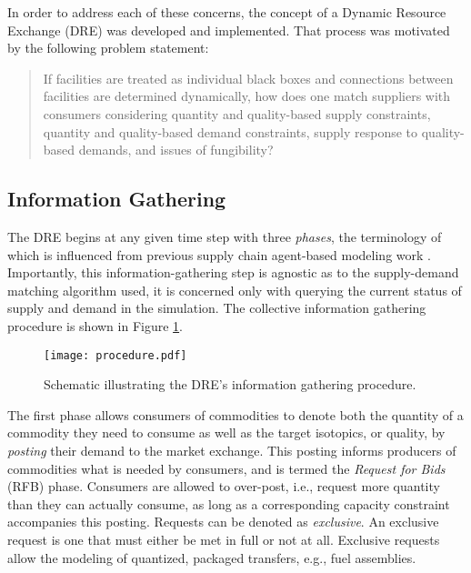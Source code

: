 In order to address each of these concerns, the concept of a Dynamic Resource
Exchange (DRE) was developed and implemented. That process was motivated by the
following problem statement:

\begin{quote}
    If facilities are treated as individual black boxes and connections between
    facilities are determined dynamically, how does one match suppliers with
    consumers considering quantity and quality-based supply constraints,
    quantity and quality-based demand constraints, supply response to
    quality-based demands, and issues of fungibility?
\end{quote}

\subsection{Information Gathering}\label{abm:dre:info}

The DRE begins at any given time step with three \textit{phases}, the
terminology of which is influenced from previous supply chain agent-based
modeling work \cite{julka_agent-based_2002}. Importantly, this
information-gathering step is agnostic as to the supply-demand matching
algorithm used, it is concerned only with querying the current status of supply
and demand in the simulation. The collective information gathering procedure is
shown in Figure \ref{fig:procedure}.

\begin{figure}
  \begin{center}
    \texttt{[image: procedure.pdf]}
    \caption[]{\label{fig:procedure}
        Schematic illustrating the DRE's information gathering procedure.}
  \end{center}
\end{figure}

The first phase allows consumers of commodities to denote both the quantity of a
commodity they need to consume as well as the target isotopics, or quality, by
\textit{posting} their demand to the market exchange. This posting informs
producers of commodities what is needed by consumers, and is termed the
\textit{Request for Bids} (RFB) phase. Consumers are allowed to over-post, i.e.,
request more quantity than they can actually consume, as long as a corresponding
capacity constraint accompanies this posting. Requests can be denoted as
\textit{exclusive}. An exclusive request is one that must either be met in full
or not at all. Exclusive requests allow the modeling of quantized, packaged
transfers, e.g., fuel assemblies. 


